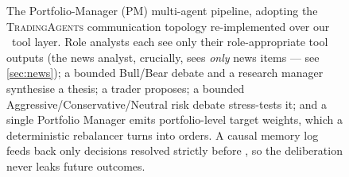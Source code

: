 \begin{figure}[t]
  \caption[Portfolio-Manager multi-agent pipeline]{The Portfolio-Manager (PM) multi-agent
  pipeline, adopting the \textsc{TradingAgents} communication topology re-implemented over
  our \mcp\ tool layer. Role analysts each see only their role-appropriate tool outputs (the
  news analyst, crucially, sees \emph{only} news items --- see \cref{sec:news}); a bounded
  Bull/Bear debate and a research manager synthesise a thesis; a trader proposes; a bounded
  Aggressive/Conservative/Neutral risk debate stress-tests it; and a single Portfolio
  Manager emits portfolio-level target weights, which a deterministic rebalancer turns into
  orders. A causal memory log feeds back only decisions resolved strictly before \tnow, so
  the deliberation never leaks future outcomes.}
  \label{fig:pmpipeline}
\end{figure}
